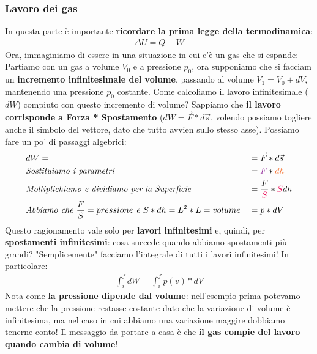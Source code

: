             \subsubsection{Lavoro dei gas}
                In questa parte è importante \textbf{ricordare la prima legge della termodinamica}:
                \begin{align*}
                    \Delta U = Q-W
                \end{align*}
                Ora, immaginiamo di essere in una situazione in cui c'è un gas che si espande:
                Partiamo con un gas a volume $V_0$ e a pressione $p_0$, ora supponiamo che si facciam un \textbf{incremento infinitesimale del volume}, passando al volume $V_1=V_0+dV$, mantenendo una pressione $p_0$ costante. Come calcoliamo il lavoro infinitesimale ($dW$) compiuto con questo incremento di volume? Sappiamo che \textbf{il lavoro corrisponde a Forza * Spostamento} ($dW = \vec{F}*d\vec{s}$, volendo possiamo togliere anche il simbolo del vettore, dato che tutto avvien sullo stesso asse). Possiamo fare un po' di passaggi algebrici:
                \begin{align*}
                    &dW= &&= \vec{F}*d\vec{s}\\
                    &\textrm{\textit{Sostituiamo i parametri}}&& =\textcolor{Purple}{F}*\textcolor{Orange}{dh}\\
                    &\textrm{\textit{Moltiplichiamo e dividiamo per la Superficie}}&& = \frac{F}{\textcolor{OrangeRed}{S}}*\textcolor{OrangeRed}{S}dh\\
                    &\textrm{\textit{Abbiamo che $\frac{F}{S}=pressione$ e $S*dh=L^2*L=volume$}} &&=p*dV
                \end{align*}
                Questo ragionamento vale solo per \textbf{lavori infinitesimi} e, quindi, per \textbf{spostamenti infinitesimi}: cosa succede quando abbiamo spostamenti più grandi? "Semplicemente" facciamo l'integrale di tutti i lavori infinitesimi! In particolare:
                \begin{align*}
                    \int_i^f dW = \int_i^f p(v)*dV
                \end{align*}
                Nota come \textbf{la pressione dipende dal volume}: nell'esempio prima potevamo mettere che la pressione restasse costante dato che la variazione di volume è infinitesima, ma nel caso in cui abbiamo una variazione maggire dobbiamo tenerne conto! Il messaggio da portare a casa è che \textbf{il gas compie del lavoro quando cambia di volume}!

